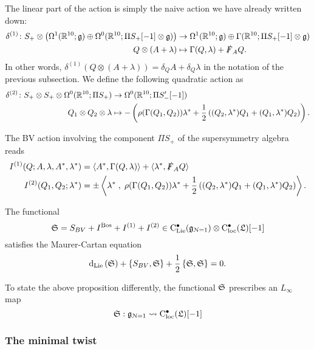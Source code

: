 \documentclass[10pt, oneside]{article}
\def\<{\langle}
\def\>{\rangle}
\def\cloc{{\rm C}_{\rm loc}}
\def\bu{\bullet}
\def\clie{{\rm C}_{\rm Lie}}
\begin{document}
The linear part of the action is simply the naive action we have already written down:
\begin{align*}
\delta^{(1)} \colon S_+ \otimes \left( \Omega^1(\mathbb R^{10} ; \mathfrak{g}) \oplus \Omega^0(\mathbb R^{10}; \Pi S_+[-1] \otimes \mathfrak{g}) \right) &\to \Omega^1(\mathbb R^{10} ; \mathfrak{g}) \oplus \Gamma(\mathbb R^{10}; \Pi S_+[-1] \otimes \mathfrak{g}) \\
Q \otimes (A + \lambda) &\mapsto  \Gamma(Q,\lambda) + \slashed{F}_A Q .
\end{align*}
In other words, $\delta^{(1)}(Q \otimes (A + \lambda)) = \delta_Q A + \delta_Q\lambda $ in the notation of the previous subsection.
We define the following quadratic action as
\begin{align*}
\delta^{(2)} \colon S_+ \otimes S_+ \otimes \Omega^0(\mathbb R^{10}; \Pi S_+) &\to \Omega^0(\mathbb R^{10}; \Pi S_-' [-1]) \\
Q_1 \otimes Q_2 \otimes \lambda &\mapsto - \left(\rho(\Gamma(Q_1,Q_2)) \lambda^* + \frac 12 \left((Q_2, \lambda^*)Q_1 + (Q_1, \lambda^*)Q_2\right)\right) .
\end{align*}

The BV action involving the component $\Pi S_+$ of the supersymmetry algebra reads
\begin{align*}
I ^{(1)} (Q ; A, \lambda, A^*, \lambda^*) & = \<A^* , \Gamma(Q, \lambda)\> + \<\lambda^*, \sd F_A Q\> \\
I^{(2)} (Q_1,Q_2 ; \lambda^*) & = \pm \left\<\lambda^* \;,\; \rho(\Gamma(Q_1,Q_2)) \lambda^* + \frac 12 \left((Q_2, \lambda^*)Q_1 + (Q_1, \lambda^*)Q_2\right)\right\> .
\end{align*}

\begin{prop}
The functional
\[
\fS = S_{BV} + I^{\rm Bos} + I^{(1)} + I^{(2)} \in \clie^\bu(\fg_{\cN=1}) \otimes \cloc^\bu(\fL) [-1]
\]
satisfies the Maurer-Cartan equation
\[
{\rm d}_{\rm Lie}  \left( \mathfrak S \right) + \{S_{BV}, \mathfrak S\} + \frac{1}{2} \left\{\mathfrak S , \mathfrak S \right\} = 0 .
\]
\end{prop}

To state the above proposition differently, the functional $\mathfrak S$ prescribes an $L_\infty$ map
\[
\fS : \fg_{\cN=1} \rightsquigarrow \cloc^\bu(\fL) [-1]
\]

\subsubsection{The minimal twist}

\end{document}
